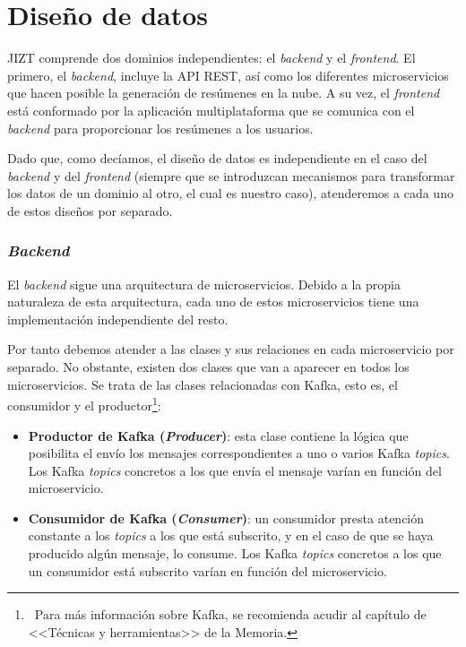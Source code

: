 \newpage

\section{Diseño de datos}

JIZT comprende dos dominios independientes: el \emph{backend} y el \emph{frontend}. El primero, el \emph{backend}, incluye la API REST, así como los diferentes microservicios que hacen posible la generación de resúmenes en la nube. A su vez, el \emph{frontend} está conformado por la aplicación multiplataforma que se comunica con el \emph{backend} para proporcionar los resúmenes a los usuarios.

Dado que, como decíamos, el diseño de datos es independiente en el caso del \emph{backend} y del \emph{frontend} (siempre que se introduzcan mecanismos para transformar los datos de un dominio al otro, el cual es nuestro caso), atenderemos a cada uno de estos diseños por separado.

\subsubsection{\Large \emph{Backend}}

El \emph{backend} sigue una arquitectura de microservicios. Debido a la propia naturaleza de esta arquitectura, cada uno de estos microservicios tiene una implementación independiente del resto.

Por tanto debemos atender a las clases y sus relaciones en cada microservicio por separado. No obstante, existen dos clases que van a aparecer en todos los microservicios. Se trata de las clases relacionadas con Kafka, esto es, el consumidor y el productor\footnote{\, Para más información sobre Kafka, se recomienda acudir al capítulo de <<Técnicas y herramientas>> de la Memoria.}:

\vspace{-0.2cm}
\begin{itemize} [\textbullet]
	\item \textbf{Productor de Kafka (\emph{Producer})}:  esta clase contiene la lógica que posibilita el envío los mensajes correspondientes a uno o varios Kafka \emph{topics}. Los Kafka \emph{topics} concretos a los que envía el mensaje varían en función del microservicio.
	
	\item \textbf{Consumidor de Kafka (\emph{Consumer})}: un consumidor presta atención constante a los \emph{topics} a los que está subscrito, y en el caso de que se haya producido algún mensaje, lo consume.  Los Kafka \emph{topics} concretos a los que un consumidor está subscrito varían en función del microservicio.
\end{itemize}

